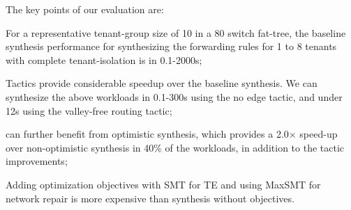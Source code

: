  The key points of our evaluation are:
\begin{compactitemize}
\item For a representative tenant-group size of 10 in a 80 switch
  fat-tree, the baseline synthesis performance for synthesizing the
  forwarding rules for 1 to 8 tenants with complete tenant-isolation
  is in 0.1-2000s;
      \item Tactics provide considerable speedup over the
        baseline synthesis.  We can
        synthesize the above workloads in 0.1-300s using the no edge
        tactic, and under 12s using the valley-free routing tactic;
      \item \Name can further benefit from 
        optimistic synthesis, which provides a 2.0$\times$ speed-up
        over non-optimistic synthesis in 40\% of the workloads, in
        addition to the tactic improvements;
        \item Adding optimization objectives with SMT for TE and using
        MaxSMT for network repair is more expensive than synthesis without
        objectives.
\end{compactitemize}


%
%







